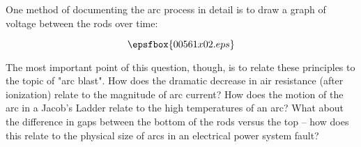 One method of documenting the arc process in detail is to draw a graph of voltage between the rods over time:

$$\epsfbox{00561x02.eps}$$

The most important point of this question, though, is to relate these principles to the topic of "arc blast".  How does the dramatic decrease in air resistance (after ionization) relate to the magnitude of arc current?  How does the motion of the arc in a Jacob's Ladder relate to the high temperatures of an arc?  What about the difference in gaps between the bottom of the rods versus the top -- how does this relate to the physical size of arcs in an electrical power system fault?




